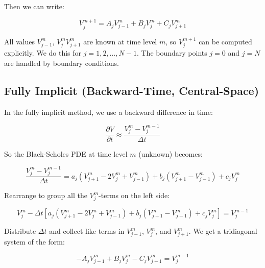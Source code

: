     Then we can write:

    \begin{equation}
        V_j^{m+1} = A_j V_{j-1}^m + B_j V_j^m + C_j V_{j+1}^m
        \label{eq:explicit_scheme_final}
    \end{equation}

    All values $V_{j-1}^m$, $V_j^m$$V_{j+1}^m$ are known at time level $m$, so $V_j^{m+1}$ can be computed explicitly.
    We do this for $j = 1, 2, \ldots, N-1$.
    The boundary points $j = 0$ and $j = N$ are handled by boundary conditions.

    \subsection{Fully Implicit (Backward-Time, Central-Space)}
    \label{sec:implicit}

    In the fully implicit method, we use a backward difference in time:

    \begin{equation}
        \frac{\partial V}{\partial t} \approx \frac{V_j^m - V_j^{m-1}}{\Delta t}
        \label{eq:backward_diff}
    \end{equation}

    So the Black-Scholes PDE at time level $m$ (unknown) becomes:

    \begin{equation}
        \frac{V_j^m - V_j^{m-1}}{\Delta t} =
            a_j \left(V_{j+1}^m - 2V_j^m + V_{j-1}^m\right)
            + b_j \left(V_{j+1}^m - V_{j-1}^m\right)
            + c_j V_j^m
        \label{eq:implicit_scheme}
    \end{equation}

    Rearrange to group all the $V_j^m$-terms on the left side:

    \begin{equation}
        V_j^m - \Delta t \left[
            a_j \left(V_{j+1}^m - 2V_j^m + V_{j-1}^m\right)
            + b_j \left(V_{j+1}^m - V_{j-1}^m\right)
            + c_j V_j^m
        \right] = V_j^{m-1}
        \label{eq:implicit_scheme_rearranged}
    \end{equation}

    Distribute $\Delta t$ and collect like terms in $V_{j-1}^m$, $V_j^m$, and $V_{j+1}^m$.
    We get a tridiagonal system of the form:

    \begin{equation}
        -A_j V_{j-1}^m + B_j V_j^m - C_j V_{j+1}^m = V_j^{m-1}
        \label{eq:tridiagonal_system}
    \end{equation}

